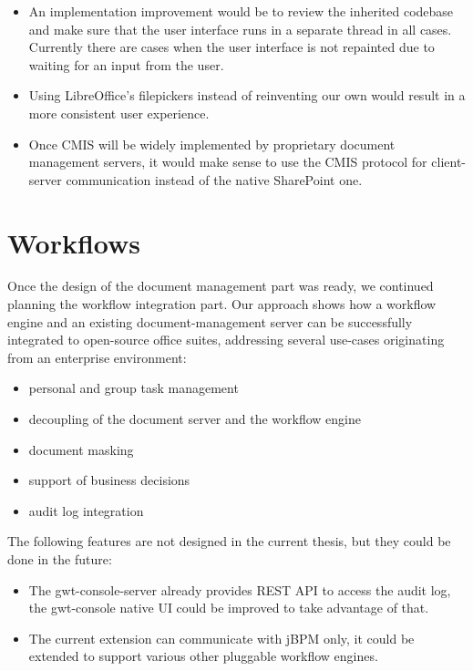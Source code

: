 \begin{itemize}
\item An implementation improvement would be to review the inherited codebase
and make sure that the user interface runs in a separate thread in all cases.
Currently there are cases when the user interface is not repainted due to
waiting for an input from the user.
\item Using LibreOffice's filepickers instead of reinventing our own would
result in a more consistent user experience.
\item Once CMIS will be widely implemented by proprietary document management
servers, it would make sense to use the CMIS protocol for client-server
communication instead of the native SharePoint one.
\end{itemize}

\section{Workflows}

Once the design of the document management part was ready, we continued
planning the workflow integration part. Our approach shows how a workflow
engine and an existing document-management server can be successfully
integrated to open-source office suites, addressing several use-cases
originating from an enterprise environment:

\begin{itemize}
\item personal and group task management
\item decoupling of the document server and the workflow engine
\item document masking
\item support of business decisions
\item audit log integration
\end{itemize}

The following features are not designed in the current thesis, but they could
be done in the future:

\begin{itemize}
\item The gwt-console-server already provides REST API to access the audit log,
the gwt-console native UI could be improved to take advantage of that.
\item The current extension can communicate with jBPM only, it could be
extended to support various other pluggable workflow engines.
\end{itemize}

